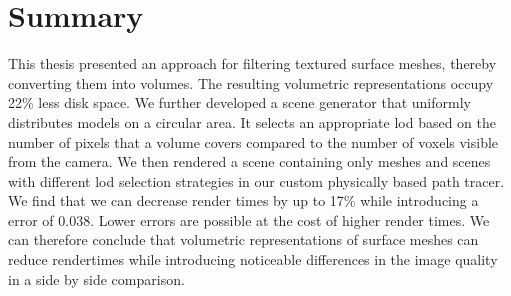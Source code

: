 \chapter{Summary}
\label{chap:summary}
This thesis presented an approach for filtering textured surface meshes, thereby converting them into volumes.
The resulting volumetric representations occupy 22\% less disk space.
We further developed a scene generator that uniformly distributes models on a circular area.
It selects an appropriate \ac{lod} based on the number of pixels that a volume covers compared to the number of voxels visible from the camera.
We then rendered a scene containing only meshes and scenes with different \ac{lod} selection strategies in our custom physically based path tracer.
We find that we can decrease render times by up to 17\% while introducing a \FLIP error of 0.038.
Lower \FLIP errors are possible at the cost of higher render times.
We can therefore conclude that volumetric representations of surface meshes can reduce rendertimes while introducing noticeable differences in the image quality in a side by side comparison.